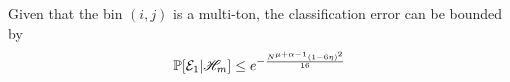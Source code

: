
\begin{lemma}
\label{Lem:MultitonClassif}
Given that the bin $(i,j)$ is a multi-ton, the classification error can be bounded by
\begin{align*}
\mathbb{P}[\mathcal{E}_1|\mathscr{H}_m]\leq e^{-\frac{N^{\mu+\alpha-1}(1-6\eta)^2}{16}}
\end{align*}
\end{lemma}

